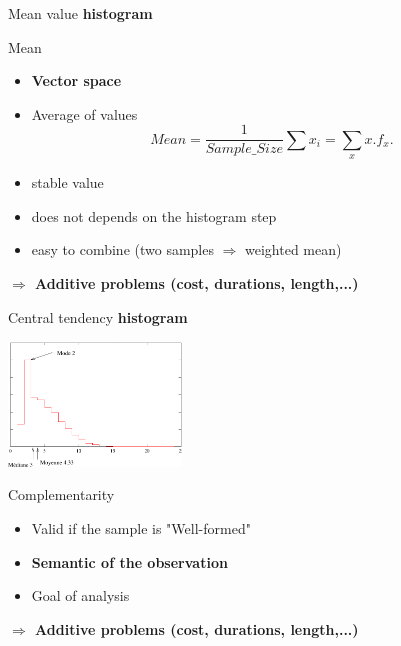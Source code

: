 \documentclass[xcolor=x11names,compress,8pt,
handout
]{beamer}
\renewcommand{\(}{\begin{columns}}
\renewcommand{\)}{\end{columns}}
\newcommand{\<}[1]{\begin{column}{#1}}
\renewcommand{\>}{\end{column}}
\begin{document}
\begin{frame}{Mean value}
{\bf histogram}
\begin{center}
\end{center}
\begin{block}{Mean}
\begin{itemize}
\item {\textcolor{Green4}{\bf Vector space}}
\item Average of values 
\[
Mean = \frac 1 {Sample\_Size}\sum x_i = \sum_{x}x.f_x .\]
\item stable value 
\item does not depends on the histogram step 
\item easy to combine (two samples $\Rightarrow$ weighted mean)
\end{itemize}


\alert{\bf $\Longrightarrow$ Additive problems (cost, durations, length,...)} 

\end{block}
\end{frame}
\begin{frame}{Central tendency}
{\bf histogram}
\begin{center}
\includegraphics[width=4.6cm]{histogramme2.pdf}
\end{center}
\begin{block}{Complementarity}
\begin{itemize}
\item Valid if the sample is "Well-formed"
\item {\textcolor{Green4}{\bf Semantic of the observation}}
\item Goal of analysis 
\end{itemize}

\alert{\bf $\Longrightarrow$ Additive problems (cost, durations, length,...)} 

\end{block}
\end{frame}
\end{document}
